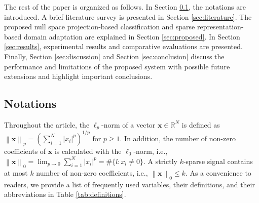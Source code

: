 \documentclass[journal,transmag]{IEEEtran}
\begin{document}
The rest of the paper is organized as follows. In Section \ref{sec:notations}, the notations are introduced. A brief literature survey is presented in Section \ref{sec:literature}. The proposed null space projection-based classification and sparse representation-based domain adaptation are explained in Section \ref{sec:proposed}. In Section \ref{sec:results}, experimental results and comparative evaluations are presented. Finally, Section \ref{sec:discussion} and Section \ref{sec:conclusion} discuss the performance and limitations of the proposed system with possible future extensions and highlight important conclusions.
 











\subsection{Notations}
\label{sec:notations}
Throughout the article, the $\ell_p$-norm of a vector $\bm{x} \in \mathbb{R}^N$ is defined as $\left\| \bm{x} \right\|_{p} = (  \sum_{i=1}^N \left\vert x_i \right\vert^p )^{1/p}$ for $p \geq 1$. In addition, the number of non-zero coefficients of $\bm{x}$ is calculated with the $\ell_0$-norm, i.e., $\left\| \bm{x}  \right\|_{0} = \lim_{p \to 0} \sum_{i=1}^N \left\vert x_i \right\vert^p = \# \{ l: x_l \neq 0 \}$. A strictly $k$-sparse signal contains at most $k$ number of non-zero coefficients, i.e., $\left\|\bm{x} \right\|_{0} \leq k$. As a convenience to readers, we provide a list of frequently used variables, their definitions, and their abbreviations in Table \ref{tab:definitions}.
\end{document}
